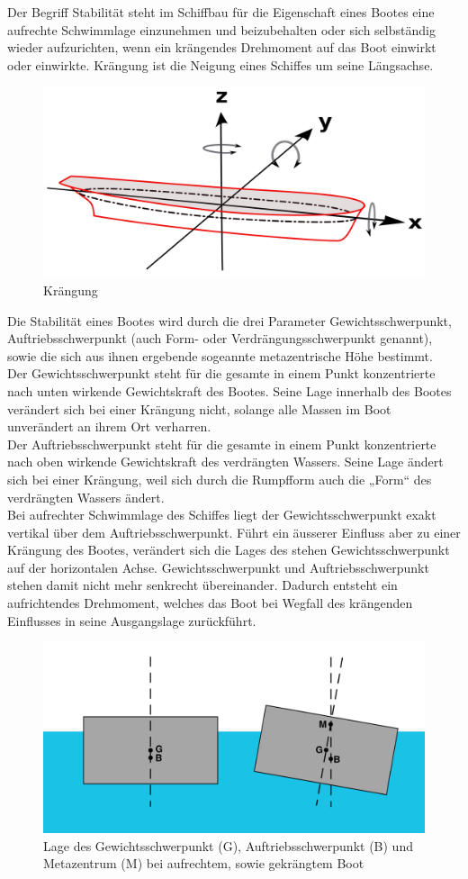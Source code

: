 Der Begriff Stabilität steht im Schiffbau für die Eigenschaft eines Bootes eine aufrechte Schwimmlage einzunehmen und beizubehalten oder sich selbständig wieder aufzurichten, wenn ein krängendes Drehmoment auf das Boot einwirkt oder einwirkte. Krängung ist die Neigung eines Schiffes um seine Längsachse. \cite{noauthor_stabilitat_2023}
\begin{figure}
    \centering
    \includegraphics[width=0.5\linewidth]{assets/Achsen_Schiffsbewegung.svg.png}
    \caption{Krängung}
    \label{fig:enter-label}
\end{figure}
Die Stabilität eines Bootes wird durch die drei Parameter Gewichtsschwerpunkt, Auftriebsschwerpunkt (auch Form- oder Verdrängungsschwerpunkt genannt), sowie die sich aus ihnen ergebende sogeannte metazentrische Höhe bestimmt. \cite{noauthor_stabilitat_2023-1}  
\\Der Gewichtsschwerpunkt steht für die gesamte in einem Punkt konzentrierte nach unten wirkende Gewichtskraft des Bootes. Seine Lage innerhalb des Bootes  verändert sich bei einer Krängung nicht, solange alle Massen im Boot unverändert an ihrem Ort verharren. \\
Der Auftriebsschwerpunkt steht für die gesamte in einem Punkt konzentrierte nach oben wirkende Gewichtskraft des verdrängten Wassers. Seine Lage ändert sich bei einer Krängung, weil sich durch die Rumpfform auch die „Form“ des verdrängten Wassers ändert.\\
Bei aufrechter Schwimmlage des Schiffes liegt der Gewichtsschwerpunkt exakt vertikal über dem Auftriebsschwerpunkt. Führt ein äusserer Einfluss aber zu einer Krängung des Bootes, verändert sich die Lages des  stehen Gewichtsschwerpunkt auf der horizontalen Achse. Gewichtsschwerpunkt und Auftriebsschwerpunkt stehen  damit nicht mehr senkrecht übereinander. Dadurch entsteht ein aufrichtendes Drehmoment, welches das Boot bei Wegfall des krängenden Einflusses in seine Ausgangslage zurückführt. 
\begin{figure}
    \centering
    \includegraphics[width=0.5\linewidth]{Metacentriskhojd-svg.svg.png}
    \caption{Lage des Gewichtsschwerpunkt (G), Auftriebsschwerpunkt (B) und Metazentrum (M) bei aufrechtem, sowie gekrängtem Boot }
    \label{fig:enter-label}
\end{figure}

